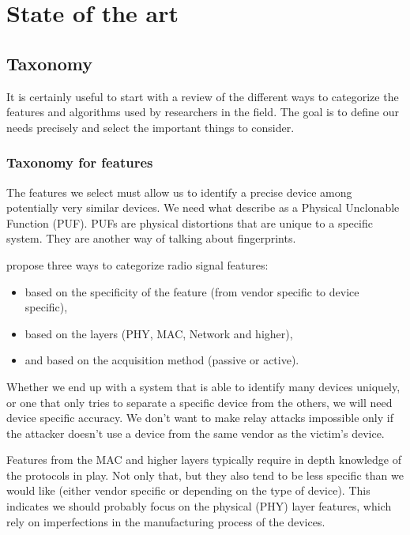 \section{State of the art}

\subsection{Taxonomy}

It is certainly useful to start with a review of the different ways to categorize the features and algorithms used by researchers in the field. The goal is to define our needs precisely and select the important things to consider.

\subsubsection{Taxonomy for features} \label{features_tax}

The features we select must allow us to identify a precise device among potentially very similar devices. We need what \textcite{delgado_passive_2020} describe as a Physical Unclonable Function (PUF). PUFs are physical distortions that are unique to a specific system. They are another way of talking about fingerprints.

\textcite{xu_device_2015} propose three ways to categorize radio signal features:

\begin{itemize}
  \item based on the specificity of the feature (from vendor specific to device specific),
  \item based on the layers (PHY, MAC, Network and higher),
  \item and based on the acquisition method (passive or active).
\end{itemize}

Whether we end up with a system that is able to identify many devices uniquely, or one that only tries to separate a specific device from the others, we will need device specific accuracy. We don't want to make relay attacks impossible only if the attacker doesn't use a device from the same vendor as the victim's device.

Features from the MAC and higher layers typically require in depth knowledge of the protocols in play. Not only that, but they also tend to be less specific than we would like (either vendor specific or depending on the type of device). This indicates we should probably focus on the physical (PHY) layer features, which rely on imperfections in the manufacturing process of the devices.

